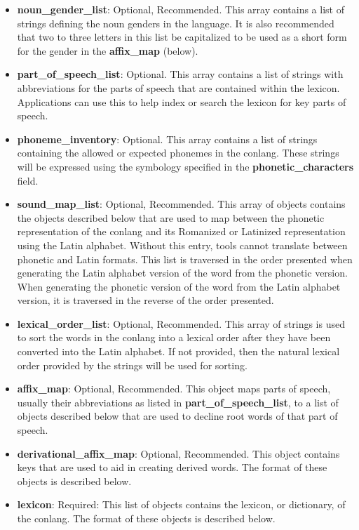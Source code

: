 \begin{itemize}
	\item \textbf{noun\_gender\_list}: Optional, Recommended. This array contains a list of strings defining the noun genders in the language.  It is also recommended that two to three letters in this list be capitalized to be used as a short form for the gender in the \textbf{affix\_map} (below).
	\item \textbf{part\_of\_speech\_list}: Optional.  This array contains a list of strings with abbreviations for the parts of speech that are contained within the lexicon.  Applications can use this to help index or search the lexicon for key parts of speech.
	\item \textbf{phoneme\_inventory}: Optional. This array contains a list of strings containing the allowed or expected phonemes in the conlang.  These strings will be expressed using the symbology specified in the \textbf{phonetic\_characters} field.
	\item \textbf{sound\_map\_list}: Optional, Recommended. This array of objects contains the objects described below that are used to map between the phonetic representation of the conlang and its Romanized or Latinized representation using the Latin alphabet.  Without this entry, tools cannot translate between phonetic and Latin formats.  This list is traversed in the order presented when generating the Latin alphabet version of the word from the phonetic version.  When generating the phonetic version of the word from the Latin alphabet version, it is traversed in the reverse of the order presented.
	\item \textbf{lexical\_order\_list}: Optional, Recommended. This array of strings is used to sort the words in the conlang into a lexical order after they have been converted into the Latin alphabet.  If not provided, then the natural lexical order provided by the strings will be used for sorting.
	\item \textbf{affix\_map}: Optional, Recommended. This object maps parts of speech, usually their abbreviations as listed in \textbf{part\_of\_speech\_list}, to a list of objects described below that are used to decline root words of that part of speech.
	\item \textbf{derivational\_affix\_map}: Optional, Recommended. This object contains keys that are used to aid in creating derived words.  The format of these objects is described below.
	\item \textbf{lexicon}: Required: This list of objects contains the lexicon, or dictionary, of the conlang.  The format of these objects is described below.

\end{itemize}
